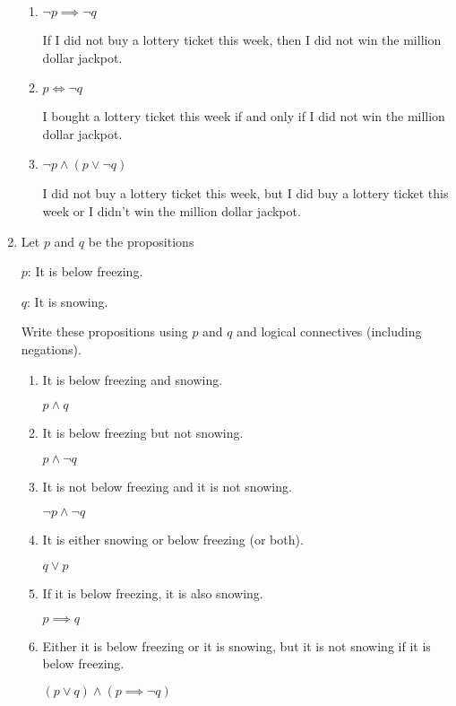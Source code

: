 \documentclass[11pt]{article}
\begin{document}
\begin{enumerate}[label=\textbf{\arabic*.}]
\begin{enumerate}[label=\textbf{\alph*)}]
		\item $\neg p \implies \neg q$
		
		If I did not buy a lottery ticket this week, then I did not win the million dollar jackpot.
		
		\item $p \iff \neg q$
		
		I bought a lottery ticket this week if and only if I did not win the million dollar jackpot.
		
		\item $\neg p \land (p \lor \neg q)$
		
		I did not buy a lottery ticket this week, but I did buy a lottery ticket this week or I didn't win the million dollar jackpot.
	\end{enumerate}

	\item Let $p$ and $q$ be the propositions
	
	\hspace{1cm}$p$: It is below freezing.
	
	\hspace{1cm}$q$: It is snowing.
	
	Write these propositions using $p$ and $q$ and logical connectives (including negations).
	\begin{enumerate}[label=\textbf{\alph*)}]
		\item It is below freezing and snowing.
		
		$p \land q$
		
		\item It is below freezing but not snowing.
		
		$p \land \neg q$
		
		\item It is not below freezing and it is not snowing.
		
		$\neg p \land \neg q$
		
		\item It is either snowing or below freezing (or both).
		
		$q \lor p$
		
		\item If it is below freezing, it is also snowing.
		
		$p \implies q$
		
		\item Either it is below freezing or it is snowing, but it is not snowing if it is below freezing.
		
		$(p \lor q) \land (p \implies \neg q)$
		

\end{enumerate}
\end{enumerate}
\end{document}
